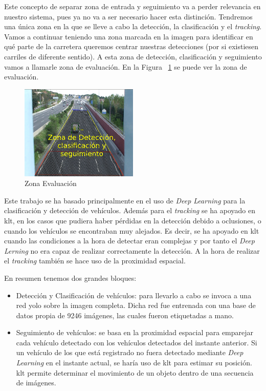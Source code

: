 Este concepto de separar zona de entrada y seguimiento va a perder relevancia en nuestro sistema, pues ya no va a ser necesario hacer esta distinción. Tendremos una única zona en la que se lleve a cabo la detección, la clasificación y el \textit{tracking}. Vamos a continuar teniendo una zona marcada en la imagen para identificar en qué parte de la carretera queremos centrar nuestras detecciones (por si existiesen carriles de diferente sentido). A esta zona de detección, clasificación y seguimiento vamos a llamarle zona de evaluación. En la Figura ~\ref{fig.nueva_zona} se puede ver la zona  de evaluación.

\begin{figure}[H] 
\begin{center}
	\includegraphics[width=0.5\textwidth]{figures/Diseno_global/nueva_zona.png}
   \caption{Zona Evaluación}
	\label{fig.nueva_zona}
\end{center}
\end{figure}


Este trabajo se ha basado principalmente en el uso de \textit{Deep Learning} para la clasificación y detección de vehículos. Además para el \textit{tracking} se ha apoyado en \acrfull{klt}, en los casos que pudiera haber pérdidas en la detección debido a oclusiones, o cuando los vehículos se encontraban muy alejados. Es decir, se ha apoyado en \acrshort{klt} cuando las condiciones a la hora de detectar eran complejas y por tanto el \textit{Deep Lerning} no era capaz de realizar correctamente la detección. A la hora de realizar el \textit{tracking} también se hace uso de la proximidad espacial.


En resumen tenemos dos grandes bloques:
\begin{itemize}
    \item Detección y Clasificación de vehículos: para llevarlo a cabo se invoca a una red \acrshort{yolo} sobre la imagen completa. Dicha red fue entrenada con una base de datos propia de 9246 imágenes, las cuales fueron etiquetadas a mano.   
    \item Seguimiento de vehículos: se basa en la proximidad espacial para emparejar cada vehículo detectado con los vehículos detectados del instante anterior. Si un vehículo de los que está registrado no fuera detectado mediante \textit{Deep Learning} en el instante actual, se haría uso de \acrshort{klt} para estimar su posición. \acrshort{klt} permite determinar el movimiento de un objeto dentro de una secuencia de imágenes.
\end{itemize}

